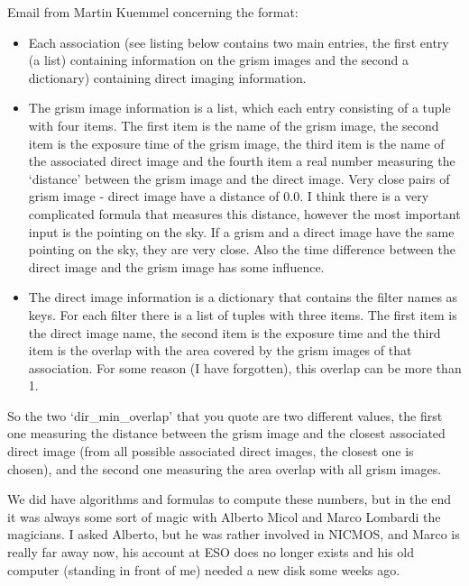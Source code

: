 \documentclass[letterpaper,10pt,english]{sphinxmanual}
\begin{document}
\begin{fulllineitems}
\label{SamPy.grisms:SamPy.grisms.generateAssociationDB.createAssociationDB}
Email from Martin Kuemmel concerning the format:
\begin{itemize}
\item {} 
Each association (see listing below contains two main entries, the
first entry (a list)  containing information on the grism images and
the second a dictionary) containing direct imaging information.

\item {} 
The grism image information is a list, which each entry consisting of
a tuple with four items. The first item is the name of the grism
image, the second item is the exposure time of the grism image,
the third item is the name of the associated direct image and the
fourth item a real number measuring the `distance' between the grism
image and the direct image. Very close pairs of grism image - direct
image have a distance of 0.0. I think there is a very complicated
formula that measures this distance, however the most important input
is the pointing on the sky. If a grism and a direct image have the
same pointing on the sky, they are very close. Also the time
difference between the direct image and the grism image has some
influence.

\item {} 
The direct image information is a dictionary that contains the filter
names as keys. For each filter there is a list of tuples with three
items. The first item is the direct image name, the second item is
the exposure time and the third item is the overlap with the area covered
by the grism images of that association. For some reason (I have forgotten),
this overlap can be more than 1.

\end{itemize}

So the two `dir\_min\_overlap' that you quote are two different values,
the first one measuring the distance between the grism image and the
closest associated direct image (from all possible associated direct
images, the closest one is chosen), and the second one measuring the
area overlap with all grism images.

We did have algorithms and formulas to compute these numbers, but in
the end it was always some sort of magic with Alberto Micol and Marco
Lombardi the magicians. I asked Alberto, but he was rather involved in
NICMOS, and Marco is really far away now, his account at ESO does no
longer exists and his old computer (standing in front of me) needed a
new disk some weeks ago.


\end{fulllineitems}
\end{document}
